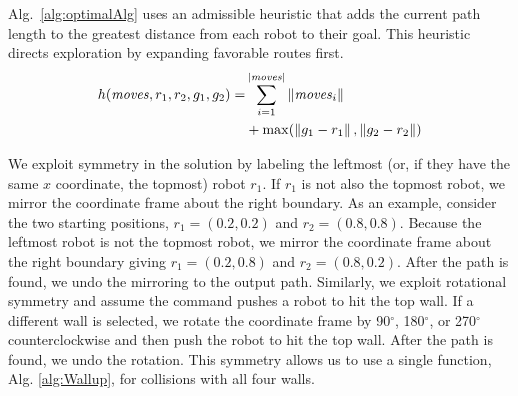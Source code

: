 Alg.~\ref{alg:optimalAlg} uses an admissible heuristic that adds the current path length to the greatest distance from each robot to their goal. This heuristic directs exploration by expanding favorable routes first.
\begin{align}\label{eq:admissibleHeuristic}
h(\text{\emph{moves}}, r_1,r_2,g_1,g_2) =& \sum_{i=1}^{|\text{\emph{moves}}|} \left\lVert\text{\emph{moves}}_i\right\rVert  \\
&+  \max( \left\lVert g_1-r_1\right\rVert, \left\lVert g_2-r_2\right\rVert ) \nonumber
\end{align}


We  exploit symmetry in the solution by labeling the leftmost (or, if they have the same $x$ coordinate, the topmost) robot $r_1$. 
 If $r_1$ is not also the topmost robot, we mirror the coordinate frame about the right boundary. 
 As an example, consider the two starting positions, $r_1 =  (0.2, 0.2) $ and $r_2 = (0.8, 0.8)$. 
  Because the leftmost robot is not the topmost robot, we mirror the coordinate frame about the right boundary giving $r_1 = (0.2, 0.8)$ and $r_2 = (0.8,0.2)$. 
 After the path is found, we undo the mirroring to the output path. 
  Similarly, we exploit rotational symmetry and assume the command pushes a robot to hit the top wall.
   If a different wall is selected, we rotate the coordinate frame by 90$^{\circ}$, 180$^{\circ}$, or 270$^{\circ}$ counterclockwise and then push the robot to hit the top wall.  After the path is found, we undo the rotation. 
   This symmetry allows us to use a single function, Alg. \ref{alg:Wallup},  for collisions with all four walls. 




